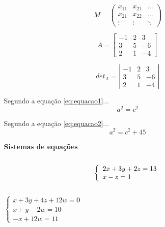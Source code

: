 \documentclass[12pt,a4paper,oneside,titlepage]{report}
\begin{document}
	\begin{displaymath}
	M = \left (
			   \begin{array}{ccc}
				x_{11} & x_{21} & \ldots \\
				x_{21} & x_{22} & \ldots \\
				\vdots & \vdots & \ddots
			   \end{array}
		  \right)
	\end{displaymath}

	\begin{displaymath}
		A = \left[ \begin{array}{ccc}
					-1 & 2  & 3 \\ 
 					3 & 5 & -6\\
 					2 & 1  & -4
				\end{array} \right]
	\end{displaymath}

\begin{displaymath}
det_A = \left| \begin{array}{rcr}
-1 & 2  & 3 \\ 
 3 & 5 & -6\\
 2 & 1  & -4
\end{array} \right|
\end{displaymath}

	Segundo a equação \ref{eq:equacao1}...
	\begin{equation}\label{eq:equacao1}
		a^2=c^2
	\end{equation}


	Segundo a equação \ref{eq:equacao2}...
	\begin{equation}\label{eq:equacao2}
		a^2=c^2+ 45
	\end{equation}


\textbf{Sistemas de equações}
\\
\\
\begin{equation}
\left\{
\begin{array}{l l}
2x+3y+2z=13\\
x-z=1
\end{array}
\right.
\end{equation}
\\

$
\left\{
\begin{array}{lll}
x+3y+4z+12w=0\\
x+y-2w=10\\
-x+12w=11
\end{array}
\right.
$
\\
\end{document}
